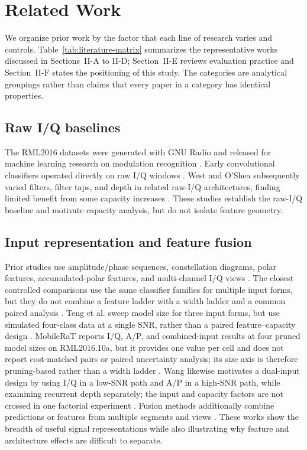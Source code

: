 \section{Related Work}
\label{sec:related}
We organize prior work by the factor that each line of research varies and
controls. Table~\ref{tab:literature-matrix} summarizes the representative
works discussed in Sections~II-A to II-D; Section~II-E reviews evaluation
practice and Section~II-F states the positioning of this study. The categories
are analytical groupings rather than claims that every paper in a category has
identical properties.



\subsection{Raw I/Q baselines}
The RML2016 datasets were generated with GNU Radio and released for machine
learning research on modulation recognition \cite{OShea2016Dataset}. Early
convolutional classifiers operated directly on raw I/Q windows
\cite{OShea2016CRR}. West and O'Shea subsequently varied filters, filter taps,
and depth in related raw-I/Q architectures, finding limited benefit from some
capacity increases \cite{West2017Deep}. These studies establish the raw-I/Q
baseline and motivate capacity analysis, but do not isolate feature geometry.

\subsection{Input representation and feature fusion}
Prior studies use amplitude/phase sequences, constellation diagrams, polar
features, accumulated-polar features, and multi-channel I/Q views
\cite{Rajendran2018Deep,Peng2019Constellation,Teng2018Polar,Teng2020Polar,
Li2023LightMFFS,Xu2020MCLDNN}. The closest controlled comparisons use the same classifier
families for multiple input forms, but they do not combine a feature ladder with
a width ladder and a common paired analysis \cite{Huang2021Visualizing}.
Teng et al. sweep model size for three input forms, but use simulated four-class
data at a single SNR, rather than a paired feature--capacity design
\cite{Teng2020Polar}.
MobileRaT reports I/Q, A/P, and combined-input results at four pruned model
sizes on RML2016.10a, but it provides one value per cell and does not report
cost-matched pairs or paired uncertainty analysis; its size axis is therefore
pruning-based rather than a width ladder \cite{Zheng2023MobileRaT}.
Wang likewise motivates a dual-input design by using I/Q in a low-SNR
path and A/P in a high-SNR path, while examining recurrent depth separately;
the input and capacity factors are not crossed in one factorial experiment
\cite{WangGuan2025DiDsNet}.
Fusion methods additionally combine predictions or features from multiple
segments and views \cite{Zheng2019Fusion,Li2023LightMFFS}. These works show
the breadth of useful signal representations while also illustrating why
feature and architecture effects are difficult to separate.

